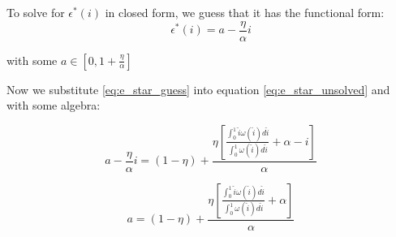 \documentclass[WP]{AEA}
\begin{document}
To solve for $  \epsilon^*(i)$ in closed form, we guess that it has the functional form:
 \begin{equation} \label{eq:e_star_guess}
 \epsilon^*(i) = a-\frac{\eta }{\alpha}i
 \end{equation}
 
 with some  $a \in [0,1+\frac{\eta }{\alpha}]$

Now we substitute \ref{eq:e_star_guess} into equation \ref{eq:e_star_unsolved} and with some algebra:

$$a-\frac{\eta }{\alpha}i= (1-\eta) + \frac{   \eta \left[ \frac{\int_0^1 \hat{i} \omega(\hat{i}) d\hat{i}}{\int_0^1  \omega(\hat{i}) d\hat{i}} + \alpha -i \right] }{\alpha } $$

$$
a= (1-\eta) + \frac{   \eta\left[ \frac{\int_0^1 \hat{i} \omega(\hat{i}) d\hat{i}}{\int_0^1  \omega(\hat{i}) d\hat{i}} + \alpha  \right] }{\alpha} 
$$
\end{document}

